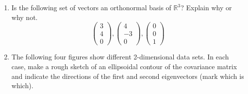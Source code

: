 \documentclass[10pt]{report}
\theoremstyle{plain}
\theoremstyle{definition}
\newcommand{\R}{\mathbb{R}}
\begin{document}
\lecturer{}
\scribe{}

\maketitle

\begin{enumerate}

\item Is the following set of vectors an orthonormal basis of $\R^3$? Explain why or why not.
$$\begin{pmatrix} 3 \\ 4 \\ 0 \end{pmatrix}, \begin{pmatrix} 4 \\ -3 \\ 0 \end{pmatrix}, \begin{pmatrix} 0 \\ 0 \\ 1 \end{pmatrix}$$

\item The following four figures show different 2-dimensional data sets. In each case, make a rough sketch of an ellipsoidal contour of the covariance matrix and indicate the directions of the first and second eigenvectors (mark which is which).


\end{enumerate}
\end{document}
